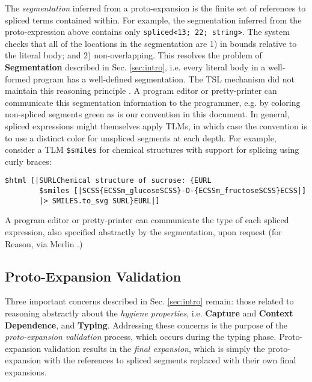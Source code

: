 \documentclass[acmsmall,review,anonymous]{acmart}\settopmatter{printfolios=true,printccs=false,printacmref=false}
\newcommand{\li}[1]{\lstinline[basicstyle=\ttfamily\fontsize{9pt}{1em}\selectfont]{#1}}
\begin{document}
The \emph{segmentation} inferred from a proto-expansion is the finite set of references to spliced terms contained within. For example, the segmentation inferred from the proto-expression above contains only \li{spliced<13; 22; string>}. %
The system checks that all of the locations in the segmentation are 1) in bounds relative to the literal body; and 2) non-overlapping. 
This resolves the problem of \textbf{Segmentation} described in Sec. \ref{sec:intro}, i.e. every literal body in a well-formed program has a well-defined segmentation. The TSL mechanism  did not maintain this reasoning principle \cite{TSLs}. A program editor or pretty-printer can communicate this segmentation information to the programmer, e.g. by coloring non-spliced segments green as is our convention in this document. In general, spliced expressions might themselves apply TLMs, in which case the convention is to use a distinct color for unspliced segments at each depth. For example, consider a TLM \li{$smiles} for chemical structures \cite{anderson1987smiles} with support for splicing using curly braces:
\begin{lstlisting}[numbers=none]
    $html [|SURLChemical structure of sucrose: {EURL
        $smiles [|SCSS{ECSSm_glucoseSCSS}-O-{ECSSm_fructoseSCSS}ECSS|] 
        |> SMILES.to_svg SURL}EURL|]
\end{lstlisting}

A program editor or pretty-printer can communicate the type of each spliced expression, also specified abstractly by the segmentation, upon request (for Reason, via Merlin \cite{Merlin}.) %

\subsection{Proto-Expansion Validation}\label{sec:uetsms-validation}
Three important concerns described in Sec. \ref{sec:intro} remain: those related to reasoning abstractly about the \emph{hygiene properties}, i.e. \textbf{Capture} and \textbf{Context Dependence}, and \textbf{Typing}. Addressing these concerns is the purpose of the \emph{proto-expansion validation} process, which occurs during the typing phase. 
Proto-expansion validation results in the \emph{final expansion}, which is simply the proto-expansion with the references to spliced segments replaced with their own final expansions. 
\end{document}
